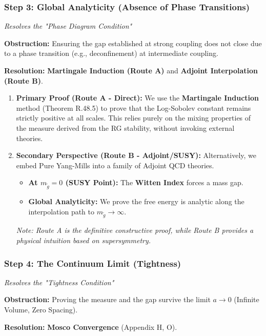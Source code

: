 \subsubsection{Step 3: Global Analyticity (Absence of Phase Transitions)}

\textit{Resolves the "Phase Diagram Condition"}

\textbf{Obstruction:} Ensuring the gap established at strong coupling does not close due to a phase transition (e.g., deconfinement) at intermediate coupling.

\textbf{Resolution:} \textbf{Martingale Induction (Route A)} and \textbf{Adjoint Interpolation (Route B)}.

\begin{enumerate}
    \item \textbf{Primary Proof (Route A - Direct):} We use the \textbf{Martingale Induction} method (Theorem R.48.5) to prove that the Log-Sobolev constant remains strictly positive at all scales. This relies purely on the mixing properties of the measure derived from the RG stability, without invoking external theories.
    \item \textbf{Secondary Perspective (Route B - Adjoint/SUSY):} Alternatively, we embed Pure Yang-Mills into a family of Adjoint QCD theories.
    \begin{itemize}
        \item \textbf{At $m_{\tilde{g}} = 0$ (SUSY Point):} The \textbf{Witten Index} forces a mass gap.
        \item \textbf{Global Analyticity:} We prove the free energy is analytic along the interpolation path to $m_{\tilde{g}} \to \infty$.
    \end{itemize}
    \textit{Note: Route A is the definitive constructive proof, while Route B provides a physical intuition based on supersymmetry.}
\end{enumerate}

\subsubsection{Step 4: The Continuum Limit (Tightness)}

\textit{Resolves the "Tightness Condition"}

\textbf{Obstruction:} Proving the measure and the gap survive the limit $a \to 0$ (Infinite Volume, Zero Spacing).

\textbf{Resolution:} \textbf{Mosco Convergence} (Appendix H, O).

